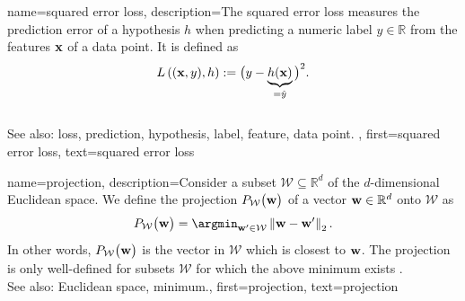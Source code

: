 
{name={squared error loss},
description={The squared 
		error loss measures the prediction error of a 
		hypothesis $h$ when predicting a numeric label $y \in \mathbb{R}$ 
		from the features ${\bf x}$ of a data point. It is 
	defined as 
\begin{equation} 
	\nonumber
	L\left(({\bf x},y),h \right) := \big(y - \underbrace{h({\bf x})}_{=\hat{y}} \big)^{2}. 
\end{equation} 
			\\ 
		See also: loss, prediction, hypothesis, label, feature, data point.
},
first={squared error loss},
text={squared error loss}
}


 {name={projection}, 
       description={Consider a subset $\mathcal{W} \subseteq \mathbb{R}^{d}$ of 
	   the $d$-dimensional Euclidean space. We define the projection $P_{\mathcal{W}}\big( {\bf w}\big) $
	   of a vector ${\bf w} \in \mathbb{R}^{d}$ onto $\mathcal{W}$ as
		\begin{equation} 
   	    \label{equ_def_proj_generic_dict}
  	     P_{\mathcal{W}}\big( {\bf w}\big)  = \argmin_{{\bf w}' \in \mathcal{W}} \left\Vert  {{\bf w} - {\bf w}'} \right\Vert_{2}. 
         \end{equation}
		 In other words, $P_{\mathcal{W}}\big( {\bf w}\big) $ is the vector in $\mathcal{W}$ 
		 which is closest to ${\bf w}$. The projection is only well-defined for subsets $\mathcal{W}$ 
		 for which the above minimum exists \cite{BoydConvexBook}.
		 			\\ 
		See also: Euclidean space, minimum.},
		 first={projection},
		 text={projection}
}


